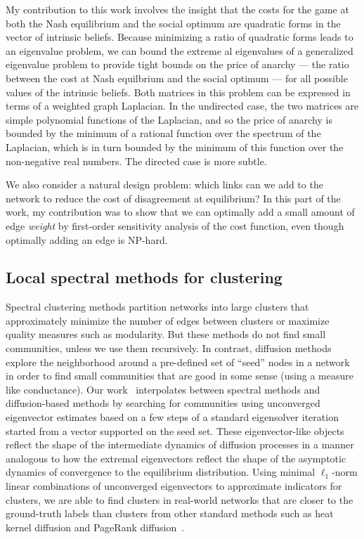 \documentclass[11pt]{amsart}
\begin{document}
My contribution to this work involves the insight that the costs
for the game at both the Nash equilibrium and the social optimum are
quadratic forms in the vector of intrinsic beliefs.
Because minimizing a ratio of quadratic forms leads to an eigenvalue
problem, we can bound the extreme al eigenvalues of a generalized
eigenvalue problem to provide tight bounds on the price of anarchy ---
the ratio between the cost at Nash equilbrium and the social optimum ---
for all possible values of the intrinsic beliefs.
Both matrices in this problem can be expressed in terms of a
weighted graph Laplacian.  In the undirected case, the two matrices are
simple polynomial functions of the Laplacian, and so the price of
anarchy is bounded by the minimum of a rational function over the
spectrum of the Laplacian, which is in turn bounded by the minimum of
this function over the non-negative real numbers.  The directed case is more subtle.

We also consider a natural design problem: which
links can we add to the network to reduce the cost of
disagreement at equilibrium? In this part of the work, my contribution
was to show that we can optimally add a small amount of edge {\em weight}
by first-order sensitivity analysis of the cost function, even though
optimally adding an edge is NP-hard.

\subsection*{Local spectral methods for clustering}

Spectral clustering methods partition networks into large
clusters that approximately minimize the number of edges between
clusters or maximize quality measures such as modularity. But these
methods do not find small communities, unless we use them
recursively.
In contrast, diffusion methods explore the neighborhood around a
pre-defined set of ``seed'' nodes in a network in order to find small
communities that are good in some sense (using a measure like
conductance).  Our work~\cite{2016-losp-kdd,2015-icdm,2015-www}
interpolates between spectral methods and diffusion-based
methods by searching for communities using unconverged eigenvector
estimates based on a few steps of a standard eigensolver iteration
started from a vector supported on the seed set. These eigenvector-like
objects reflect the shape of the intermediate dynamics of diffusion
processes in a manner analogous to how the extremal eigenvectors
reflect the shape of the asymptotic dynamics of
convergence to the equilibrium distribution.  Using minimal
$\ell_1$-norm linear combinations of unconverged eigenvectors
to approximate indicators for clusters, we are able to find
clusters in real-world networks that are closer to the ground-truth
labels than clusters from other standard methods such
as heat kernel diffusion and PageRank
diffusion~\cite{Andersen:2006:PR,Kloumann:2014:Community,Kloster:2014:Heat}.
\end{document}
